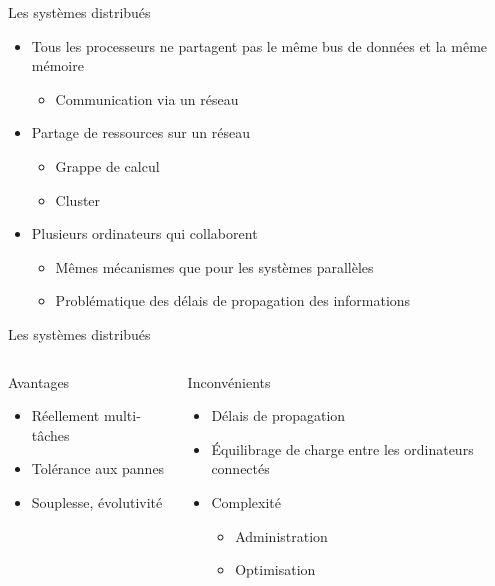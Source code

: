 \begin{frame}{Les systèmes distribués}
\begin{itemize}
\item Tous les processeurs ne partagent pas le même bus de données et la même mémoire
\begin{itemize}
\item Communication via un réseau
\end{itemize}
\item Partage de ressources sur un réseau
\begin{itemize}
\item Grappe de calcul
\item Cluster
\end{itemize}
\item Plusieurs ordinateurs qui collaborent
\begin{itemize}
\item Mêmes mécanismes que pour les systèmes parallèles
\item Problématique des délais de propagation des informations
\end{itemize}
\end{itemize}
\end{frame}

\begin{frame}{Les systèmes distribués}
\begin{columns}
\begin{block}{Avantages}
\begin{itemize}
\item Réellement multi-tâches
\item Tolérance aux pannes
\item Souplesse, évolutivité
\end{itemize}
\end{block}
\begin{block}{Inconvénients}
\begin{itemize}
\item Délais de propagation
\item Équilibrage de charge entre les ordinateurs connectés
\item Complexité
\begin{itemize}
\item Administration
\item Optimisation
\end{itemize}
\end{itemize}
\end{block}
\end{columns}
\end{frame}

